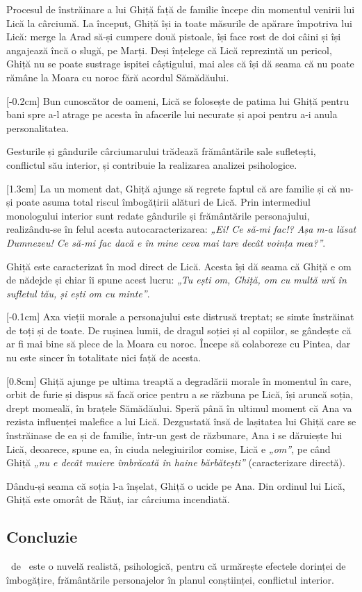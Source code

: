 Procesul de înstrăinare a lui Ghiță față de familie începe din momentul venirii lui Lică la cârciumă. La început, Ghiță își ia toate măsurile de apărare împotriva lui Lică: merge la Arad să-și cumpere două pistoale, își face rost de doi câini și își angajează încă o slugă, pe Marți. Deși înțelege că Lică reprezintă un pericol, Ghiță nu se poate sustrage ispitei câștigului, mai ales că își dă seama că nu poate rămâne la Moara cu noroc fără acordul Sămădăului.

[-0.2cm]
Bun cunoscător de oameni, Lică se folosește de patima lui Ghiță pentru bani spre a-l atrage pe acesta în afacerile lui necurate și apoi pentru a-i anula personalitatea.

Gesturile și gândurile cârciumarului trădează frământările sale sufletești, conflictul său interior, și contribuie la realizarea analizei psihologice.

[1.3cm]
La un moment dat, Ghiță ajunge să regrete faptul că are familie și că nu-și poate asuma total riscul îmbogățirii alături de Lică. Prin intermediul monologului interior sunt redate gândurile și frământările personajului, realizându-se în felul acesta autocaracterizarea: \textit{„Ei! Ce să-mi fac!? Așa m-a lăsat Dumnezeu! Ce să-mi fac dacă e în mine ceva mai tare decât voința mea?”}.

Ghiță este caracterizat în mod direct de Lică. Acesta își dă seama că Ghiță e om de nădejde și chiar îi spune acest lucru: \textit{„Tu ești om, Ghiță, om cu multă ură în sufletul tău, și ești om cu minte”}.

[-0.1cm]
Axa vieții morale a personajului este distrusă treptat; se simte înstrăinat de toți și de toate. De rușinea lumii, de dragul soției și al copiilor, se gândește că ar fi mai bine să plece de la Moara cu noroc. Începe să colaboreze cu Pintea, dar nu este sincer în totalitate nici față de acesta.

[0.8cm]
Ghiță ajunge pe ultima treaptă a degradării morale în momentul în care, orbit de furie și dispus să facă orice pentru a se răzbuna pe Lică, își aruncă soția, drept momeală, în brațele Sămădăului. Speră până în ultimul moment că Ana va rezista influenței malefice a lui Lică. Dezgustată însă de lașitatea lui Ghiță care se înstrăinase de ea și de familie, într-un gest de răzbunare, Ana i se dăruiește lui Lică, deoarece, spune ea, în ciuda nelegiuirilor comise, Lică e \textit{„om”}, pe când Ghiță \textit{„nu e decât muiere îmbrăcată în haine bărbătești”} (caracterizare directă).

Dându-și seama că soția l-a înșelat, Ghiță o ucide pe Ana. Din ordinul lui Lică, Ghiță este omorât de Răuț, iar cârciuma incendiată.


\subsection{Concluzie}

\operatitle\ de \operaauthor\ este o nuvelă realistă, psihologică, pentru că urmărește efectele dorinței de îmbogățire, frământările personajelor în planul conștiinței, conflictul interior.
